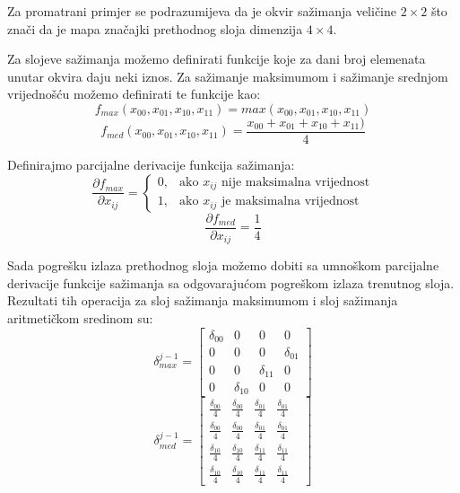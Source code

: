 \documentclass[times, utf8, zavrsni]{fer}
\begin{document}
Za promatrani primjer se podrazumijeva da je okvir sažimanja veličine $2 \times 2$ što znači da je mapa značajki prethodnog sloja dimenzija $4 \times 4$.

Za slojeve sažimanja možemo definirati funkcije koje za dani broj elemenata unutar okvira daju neki iznos. Za sažimanje maksimumom i sažimanje srednjom vrijednošću možemo definirati te funkcije kao:
\begin{equation}
f_{max}(x_{00}, x_{01}, x_{10}, x_{11}) = max(x_{00}, x_{01}, x_{10}, x_{11})
\end{equation}
\begin{equation}
f_{med}(x_{00}, x_{01}, x_{10}, x_{11}) = \frac{x_{00} + x_{01} + x_{10} + x_{11})}{4}
\end{equation}

Definirajmo parcijalne derivacije funkcija sažimanja:
\begin{equation}
\dfrac{\partial f_{max}}{\partial x_{ij}} = \begin{cases}
    0, & \text{ako $x_{ij}$ nije maksimalna vrijednost}\\
    1, & \text{ako $x_{ij}$ je maksimalna vrijednost}
  \end{cases}
\end{equation}
\begin{equation}
\dfrac{\partial f_{med}}{\partial x_{ij}} = \frac{1}{4}
\end{equation}

Sada pogrešku izlaza prethodnog sloja možemo dobiti sa umnoškom parcijalne derivacije funkcije sažimanja sa odgovarajućom pogreškom izlaza trenutnog sloja. Rezultati tih operacija za sloj sažimanja maksimumom i sloj sažimanja aritmetičkom sredinom su:
\begin{equation}
\delta^{j-1}_{max} = \left[
\begin{matrix}
\delta_{00} & 0 & 0 & 0 \\
0 & 0 & 0 & \delta_{01} \\
0 & 0 & \delta_{11} & 0\\
0 & \delta_{10} & 0 & 0 
\end{matrix}
\right]
\end{equation}
\begin{equation}
\delta^{j-1}_{med} = \left[
\begin{matrix}
\frac{\delta_{00}}{4} & \frac{\delta_{00}}{4} & \frac{\delta_{01}}{4} & \frac{\delta_{01}}{4} & \\
\frac{\delta_{00}}{4} & \frac{\delta_{00}}{4} & \frac{\delta_{01}}{4} & \frac{\delta_{01}}{4} & \\
\frac{\delta_{10}}{4} & \frac{\delta_{10}}{4} & \frac{\delta_{11}}{4} & \frac{\delta_{11}}{4} & \\
\frac{\delta_{10}}{4} & \frac{\delta_{10}}{4} & \frac{\delta_{11}}{4} & \frac{\delta_{11}}{4} &
\end{matrix}
\right]
\end{equation}
\end{document}
